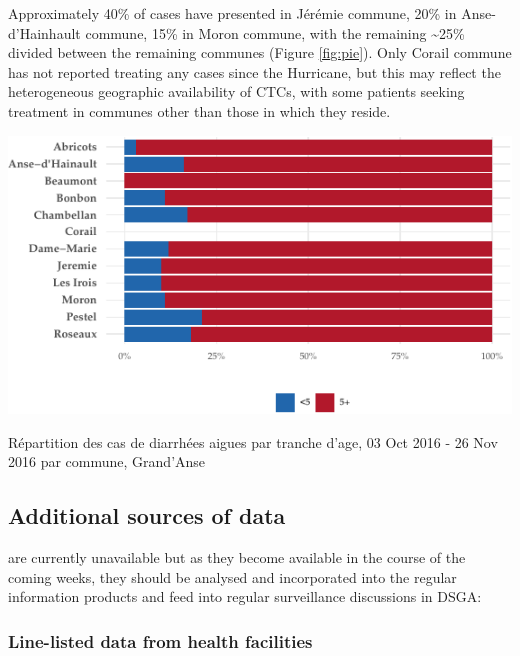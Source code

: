 \documentclass[]{tufte-handout}
\begin{document}
Approximately 40\% of cases have presented in Jérémie commune, 20\% in
Anse-d'Hainhault commune, 15\% in Moron commune, with the remaining
\textasciitilde{}25\% divided between the remaining communes (Figure
\ref{fig:pie}). Only Corail commune has not reported treating any cases
since the Hurricane, but this may reflect the heterogeneous geographic
availability of CTCs, with some patients seeking treatment in communes
other than those in which they reside.

\begin{marginfigure}
\includegraphics{rapport_final_files/figure-latex/unnamed-chunk-3-1} \caption[Répartition des cas de diarrhées aigues par tranche d'age, 03 Oct 2016 - 26 Nov 2016 par commune, Grand’Anse]{Répartition des cas de diarrhées aigues par tranche d'age, 03 Oct 2016 - 26 Nov 2016 par commune, Grand’Anse}\label{fig:unnamed-chunk-3}
\end{marginfigure}

\clearpage

\subsection{Additional sources of
data}\label{additional-sources-of-data}

 are currently
unavailable but as they become available in the course of the coming
weeks, they should be analysed and incorporated into the regular
information products and feed into regular surveillance discussions in
DSGA:

\subsubsection{Line-listed data from health
facilities}\label{line-listed-data-from-health-facilities}
\end{document}
